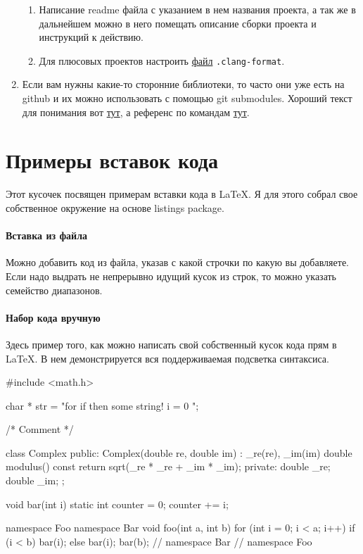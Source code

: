 \documentclass{article}
\begin{document}
\begin{enumerate}
\begin{enumerate}
\item Написание readme файла с указанием в нем названия проекта, а так же в дальнейшем можно в него помещать описание сборки проекта и инструкций к действию.

\item Для плюсовых проектов настроить \href{https://clang.llvm.org/docs/ClangFormatStyleOptions.html}{файл} \verb".clang-format".
\end{enumerate}

\item Если вам нужны какие-то сторонние библиотеки, то часто они уже есть на github и их можно использовать с помощью git submodules. Хороший текст для понимания вот \href{https://git-scm.com/book/en/v2/Git-Tools-Submodules}{тут}, а референс по командам \href{https://git-scm.com/docs/git-submodule}{тут}.
\end{enumerate}

\appendix

\section{Примеры вставок кода}

Этот кусочек посвящен примерам вставки кода в \LaTeX. Я для этого собрал свое собственное окружение на основе listings package.

\paragraph{Вставка из файла}

Можно добавить код из файла, указав с какой строчки по какую вы добавляете.
Если надо выдрать не непрерывно идущий кусок из строк, то можно указать семейство диапазонов.

\paragraph{Набор кода вручную}

Здесь пример того, как можно написать свой собственный кусок кода прям в \LaTeX. В нем демонстрируется вся поддерживаемая подсветка синтаксиса.
\begin{cppcode}
#include <math.h>

char * str = "for if then some string! i = 0 ";

/*
Comment
*/

class Complex {
public:
  Complex(double re, double im)
    : _re(re), _im(im) {
  }
  double modulus() const {
    return sqrt(_re * _re + _im * _im);
  }
private:
  double _re;
  double _im;
};

void bar(int i) {
  static int counter = 0;
  counter += i;
}

namespace Foo {
namespace Bar {
void foo(int a, int b) {
  for (int i = 0; i < a; i++) {
    if (i < b)
      bar(i);
    else {
      bar(i);
      bar(b);
    }
  }
}
} // namespace Bar
} // namespace Foo
\end{cppcode}
\end{document}
